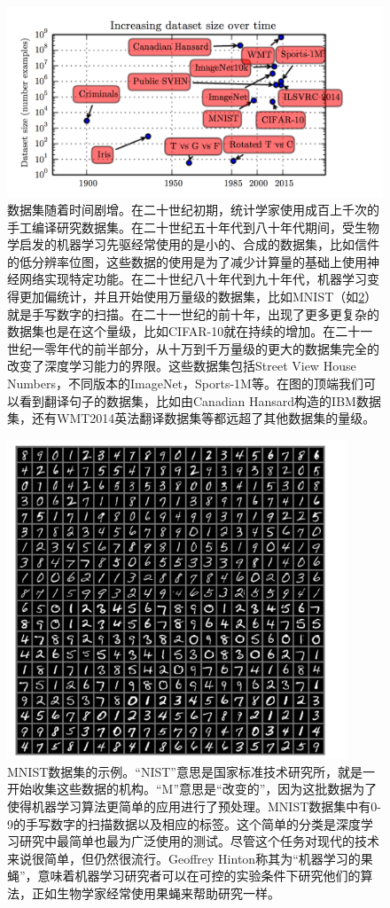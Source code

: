 \documentclass[a4paper,11pt]{book}
\begin{document}
\begin{figure}[htbp] %
   \centering
   \includegraphics[width=5in]{fig/chap1/1.8.png} 
   \caption{数据集随着时间剧增。在二十世纪初期，统计学家使用成百上千次的手工编译研究数据集。在二十世纪五十年代到八十年代期间，受生物学启发的机器学习先驱经常使用的是小的、合成的数据集，比如信件的低分辨率位图，这些数据的使用是为了减少计算量的基础上使用神经网络实现特定功能。在二十世纪八十年代到九十年代，机器学习变得更加偏统计，并且开始使用万量级的数据集，比如MNIST（如\ref{fig:1.9}）就是手写数字的扫描。在二十一世纪的前十年，出现了更多更复杂的数据集也是在这个量级，比如CIFAR-10就在持续的增加。在二十一世纪一零年代的前半部分，从十万到千万量级的更大的数据集完全的改变了深度学习能力的界限。这些数据集包括Street View House Numbers，不同版本的ImageNet，Sports-1M等。在图的顶端我们可以看到翻译句子的数据集，比如由Canadian Hansard构造的IBM数据集，还有WMT2014英法翻译数据集等都远超了其他数据集的量级。}
   \label{fig:1.8}
\end{figure}


\begin{figure}[htbp] %
   \centering
   \includegraphics[width=4in]{fig/chap1/1.9.png} 
   \caption{MNIST数据集的示例。“NIST”意思是国家标准技术研究所，就是一开始收集这些数据的机构。“M”意思是“改变的”，因为这批数据为了使得机器学习算法更简单的应用进行了预处理。MNIST数据集中有0-9的手写数字的扫描数据以及相应的标签。这个简单的分类是深度学习研究中最简单也最为广泛使用的测试。尽管这个任务对现代的技术来说很简单，但仍然很流行。Geoffrey Hinton称其为“机器学习的果蝇”，意味着机器学习研究者可以在可控的实验条件下研究他们的算法，正如生物学家经常使用果蝇来帮助研究一样。}
   \label{fig:1.9}
 \end{figure}
   
\end{document}
